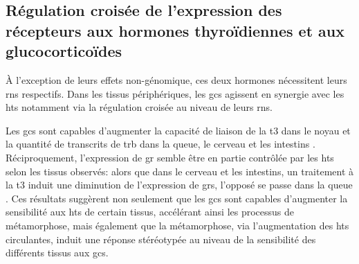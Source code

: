 \documentclass[../main.tex]{subfiles}
\begin{document}
	\subsection{Régulation croisée de l'expression des récepteurs aux hormones thyroïdiennes et aux glucocorticoïdes}
		À l'exception de leurs effets non-génomique, ces deux hormones nécessitent leurs \glspl{rn} respectifs.
		Dans les tissus périphériques, les \glspl{gc} agissent en synergie avec les \glspl{ht} notamment via la régulation croisée au niveau de leurs \glspl{rn}.
		\par
		Les \glspl{gc} sont capables d'augmenter la capacité de liaison de la \gls{t3} dans le noyau \citep{Kikuyama1983} et la quantité de transcrits de \gls{trb} dans la queue, le cerveau et les intestins \citep{Bonett2010}.
		Réciproquement, l'expression de \gls{gr} semble être en partie contrôlée par les \glspl{ht} selon les tissus observés: alors que dans le cerveau et les intestins, un traitement à la \gls{t3} induit une diminution de l'expression de \glspl{gr}, l'opposé se passe dans la queue \citep{Krain2004}.
		Ces résultats suggèrent non seulement que les \glspl{gc} sont capables d'augmenter la sensibilité aux \glspl{ht} de certain tissus, accélérant ainsi les processus de métamorphose, mais également que la métamorphose, via l'augmentation des \glspl{ht} circulantes, induit une réponse stéréotypée au niveau de la sensibilité des différents tissus aux \glspl{gc}.
\end{document}
